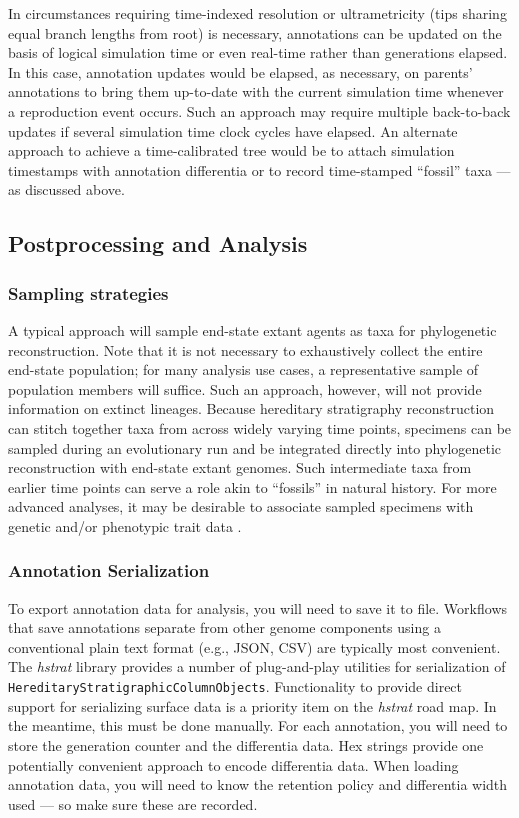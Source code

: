 In circumstances requiring time-indexed resolution or ultrametricity (tips sharing equal branch lengths from root) is necessary, annotations can be updated on the basis of logical simulation time or even real-time rather than generations elapsed.
In this case, annotation updates would be elapsed, as necessary, on parents' annotations to bring them up-to-date with the current simulation time whenever a reproduction event occurs.
Such an approach may require multiple back-to-back updates if several simulation time clock cycles have elapsed.
An alternate approach to achieve a time-calibrated tree would be to attach simulation timestamps with annotation differentia or to record time-stamped ``fossil'' taxa --- as discussed above.

\subsection{Postprocessing and Analysis}

\subsubsection{Sampling strategies}

A typical approach will sample end-state extant agents as taxa for phylogenetic reconstruction.
Note that it is not necessary to exhaustively collect the entire end-state population; for many analysis use cases, a representative sample of population members will suffice.
Such an approach, however, will not provide information on extinct lineages.
Because hereditary stratigraphy reconstruction can stitch together taxa from across widely varying time points, specimens can be sampled during an evolutionary run and be integrated directly into phylogenetic reconstruction with end-state extant genomes.
Such intermediate taxa from earlier time points can serve a role akin to ``fossils'' in natural history.
For more advanced analyses, it may be desirable to associate sampled specimens with genetic and/or phenotypic trait data \citep{dolson2019modes,khabbazian2016fast}.

\subsubsection{Annotation Serialization}

To export annotation data for analysis, you will need to save it to file.
Workflows that save annotations separate from other genome components using a conventional plain text format (e.g., JSON, CSV) are typically most convenient.
The \textit{hstrat} library provides a number of plug-and-play utilities for serialization of \texttt{HereditaryStratigraphicColumnObjects}.
Functionality to provide direct support for serializing surface data is a priority item on the \textit{hstrat} road map.
In the meantime, this must be done manually.
For each annotation, you will need to store the generation counter and the differentia data.
Hex strings provide one potentially convenient approach to encode differentia data.
When loading annotation data, you will need to know the retention policy and differentia width used --- so make sure these are recorded.

